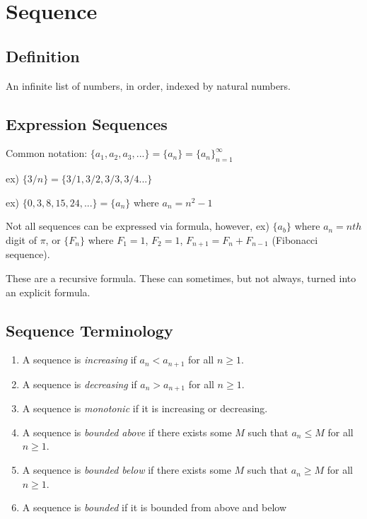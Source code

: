 \documentclass{article}
\begin{document}
\section{Sequence}

\subsection{Definition}

An infinite list of numbers, in order, indexed by natural numbers.

\subsection{Expression Sequences}

Common notation: $\{a_1,a_2,a_3, ...\} = \{a_n\} = \{a_n\}_{n=1}^{\infty}$

ex) $\{3/n\} = \{3/1,3/2,3/3,3/4...\}$

ex) $\{0,3,8,15,24,...\} = \{a_n\}$ where $a_n = n^2-1$


Not all sequences can be expressed via formula, however, ex) $\{a_b\}$ where $a_n=nth$ digit of $\pi$, or $\{F_n\}$ where $F_1=1$, $F_2=1$, $F_{n+1} = F_n+F_{n-1}$ (Fibonacci sequence).

These are a recursive formula. These can sometimes, but not always, turned into an explicit formula. 

\subsection{Sequence Terminology}

\begin{enumerate}
    \item A sequence is \textit{increasing} if $a_n < a_{n+1}$ for all $n\geq1$.
    \item A sequence is \textit{decreasing} if $a_n > a_{n+1}$ for all $n\geq1$.
    \item A sequence is \textit{monotonic} if it is increasing or decreasing.
    \item A sequence is \textit{bounded above} if there exists some $M$ such that $a_n\leq M$ for all $n\geq1$.
    \item A sequence is \textit{bounded below} if there exists some $M$ such that $a_n\geq M$ for all $n\geq1$.
    \item A sequence is \textit{bounded} if it is bounded from above and below
\end{enumerate}
\end{document}
